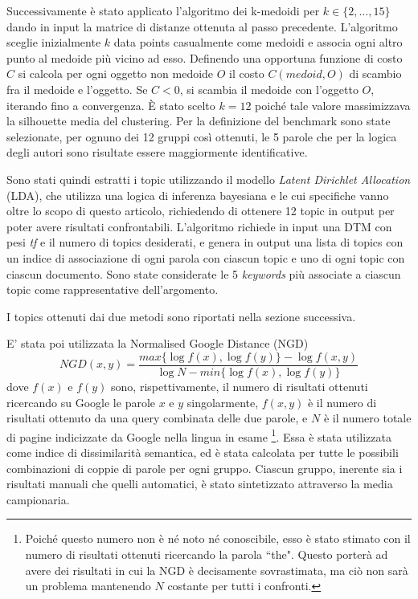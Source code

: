 \documentclass[]{article}
\begin{document}
Successivamente è stato applicato l'algoritmo dei k-medoidi per $k \in \{2, \dots, 15\}$ dando in input la matrice di distanze ottenuta al passo precedente. L'algoritmo sceglie inizialmente $k$ data points casualmente come medoidi e associa ogni altro punto al medoide più vicino ad esso.
Definendo una opportuna funzione di costo $C$ si calcola per ogni oggetto non medoide $O$ il costo $C(medoid, O)$ di scambio fra il medoide e l'oggetto.  Se $C<0$, si scambia il medoide con l'oggetto $O$, iterando fino a convergenza.
\newline
È stato scelto $k=12$ poiché tale valore massimizzava la silhouette media del clustering.
\newline
Per la definizione del benchmark sono state selezionate, per ognuno dei 12 gruppi così ottenuti, le 5 parole che per la logica degli autori sono risultate essere maggiormente identificative.


Sono stati quindi estratti i topic utilizzando il modello \textit{Latent Dirichlet Allocation} (LDA), che utilizza una logica di inferenza bayesiana \cite{survey} e le cui specifiche vanno oltre lo scopo di questo articolo, richiedendo di ottenere 12 topic in output per poter avere risultati confrontabili.
L'algoritmo richiede in input una DTM con pesi \textit{tf} e il numero di topics desiderati, e genera in output una lista di topics con un indice di associazione di ogni parola con ciascun topic e uno di ogni topic con ciascun documento.
Sono state considerate le 5 \textit{keywords} più associate a ciascun topic come rappresentative dell'argomento.


I topics ottenuti dai due metodi sono riportati nella sezione successiva.


E' stata poi utilizzata la Normalised Google Distance (NGD) \cite{NGD} \[NGD(x,y)=\frac{max\{\log f(x),\log f(y)\}-\log f(x,y)}{\log N-min\{\log f(x),\log f(y)\}} \]
dove $f(x)$ e $f(y)$ sono, rispettivamente, il numero di risultati ottenuti ricercando su Google le parole $x$ e $y$ singolarmente, $f(x,y)$ è il numero di risultati ottenuto da una query combinata delle due parole, e $N$ è il numero totale di pagine indicizzate da Google nella lingua in esame \footnote{Poiché questo numero non è né noto né conoscibile, esso è stato stimato con il numero di risultati ottenuti ricercando la parola ``the". Questo porterà ad avere dei risultati in cui la NGD è decisamente sovrastimata, ma ciò non sarà un problema mantenendo $N$ costante per tutti i confronti.}.
Essa \`e stata utilizzata come indice di dissimilarità semantica, ed è stata calcolata per tutte le possibili combinazioni di coppie di parole per ogni gruppo.  Ciascun gruppo, inerente sia i risultati manuali che quelli automatici, \`e stato sintetizzato attraverso la media campionaria.
\end{document}
